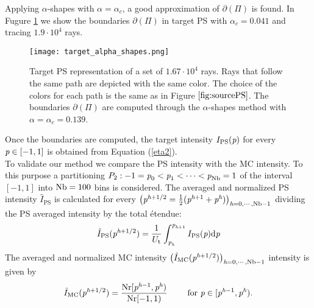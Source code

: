 Applying $\alpha$-shapes with $\alpha=\alpha_c$, a good approximation of $\partial$$(\Pi)$ is found. In Fugure \ref{fig:targetPS} we show the boundaries 
$\partial$$(\Pi)$ in target PS  with $\alpha_c=0.041$ and tracing $1.9\cdot10^4$ rays.
  \begin{figure}[h]
  \begin{center}
  \texttt{[image: target\_alpha\_shapes.png]}
  \end{center}
  \caption{\footnotesize{Target PS representation of a set of $1.67 \cdot 10^4$ rays.
  Rays that follow the same path are depicted with the same color. The choice of the colors for each path is the same as in Figure $\ref{fig:sourcePS}$. The boundaries $\partial$$(\Pi)$ are computed through the $\alpha$-shapes method with $\alpha = \alpha_c = 0.139$.}}
  \label{fig:targetPS}
\end{figure}
Once the boundaries are computed, the target intensity $I_{\textrm{PS}}(\textit{p})$ for every $\textit{p}\in[-1,1]$ is obtained from Equation (\ref{eta2}). \\ \indent
To validate our method we compare the PS intensity with the MC intensity. 
To this purpose a partitioning $P_2:-1=\textit{p}_{0}<\textit{p}_1<\cdots<\textit{p}_{\textrm{Nb}}=1$ of the interval $[-1,1]$ into $\textrm{Nb}=100$ bins is considered. 
The averaged and normalized PS intensity $\hat{I}_{\textrm{PS}}$ is calculated for every 
$\big(\textit{p}^{\textit{h}+1/2} = \frac{1}{2}(\textit{p}^{\textit{h}+1}+ \textit{p}^{\textit{h}})\big)_{\textit{h}=0, \cdots, \textrm{Nb}-1}$ dividing the PS averaged intensity by the total \'{e}tendue:
\begin{equation}\label{eq:normalized_PS_intensity}
\hat{I}_{\textrm{PS}}(\textit{p}^{\textit{h}+1/2}) = \frac{1}{U_{\textrm{t}}}\int_{\textit{p}_{\textit{h}}}^{\textit{p}_{\textit{h}+1}} I_{\textrm{PS}}(\textit{p})\textrm{d}\textit{p}
\end{equation}
The averaged and normalized MC intensity $\big(\hat{I}_{\textrm{MC}}(\textit{p}^{\textit{h}+1/2})\big)_{\textit{h} = 0, \cdots, \textrm{Nb}-1}$ intensity is given by
\begin{equation}\label{eq:normalized_MC_intensity}
\hat{I}_{\textrm{MC}}(\textit{p}^{\textit{h}+1/2}) = \frac{\textrm{Nr}[\textit{p}^{\textit{h}-1},\textit{p}^{\textit{h}})}{\textrm{Nr}[-1,1)} 
\qquad \mbox{ for } \textit{p}\in[\textit{p}^{\textit{h}-1}, \textit{p}^{\textit{h}}).
\end{equation} 
